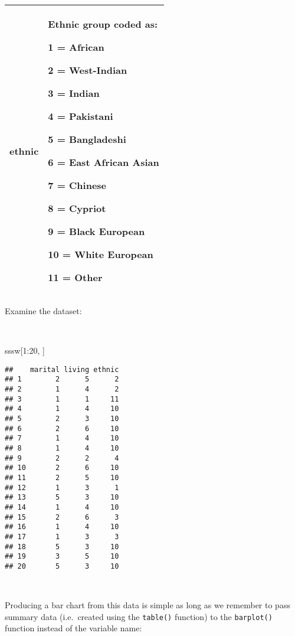 \documentclass[
  12pt,
  a4paper]{book}
\newenvironment{Shaded}{\begin{snugshade}}{\end{snugshade}}
\newcommand{\DecValTok}[1]{\textcolor[rgb]{0.00,0.00,0.81}{#1}}
\newcommand{\NormalTok}[1]{#1}
\newcommand{\SpecialCharTok}[1]{\textcolor[rgb]{0.00,0.00,0.00}{#1}}
\begin{document}
\begin{longtable}[]{@{}
  >{\raggedright\arraybackslash}p{}
  >{\raggedright\arraybackslash}p{}@{}}
\toprule
\endhead
\textbf{ethnic} & Ethnic group coded as:

1 = African

2 = West-Indian

3 = Indian

4 = Pakistani

5 = Bangladeshi

6 = East African Asian

7 = Chinese

8 = Cypriot

9 = Black European

10 = White European

11 = Other \\
\bottomrule
\end{longtable}

\newpage

Examine the dataset:

~

\begin{Shaded}
\begin{Highlighting}[]
\NormalTok{sssw[}\DecValTok{1}\SpecialCharTok{:}\DecValTok{20}\NormalTok{, ]}
\end{Highlighting}
\end{Shaded}

\begin{verbatim}
##    marital living ethnic
## 1        2      5      2
## 2        1      4      2
## 3        1      1     11
## 4        1      4     10
## 5        2      3     10
## 6        2      6     10
## 7        1      4     10
## 8        1      4     10
## 9        2      2      4
## 10       2      6     10
## 11       2      5     10
## 12       1      3      1
## 13       5      3     10
## 14       1      4     10
## 15       2      6      3
## 16       1      4     10
## 17       1      3      3
## 18       5      3     10
## 19       3      5     10
## 20       5      3     10
\end{verbatim}

~

Producing a bar chart from this data is simple as long as we remember to pass summary data (i.e.~created using the \texttt{table()} function) to the \texttt{barplot()} function instead of the variable name:

~
\end{document}
